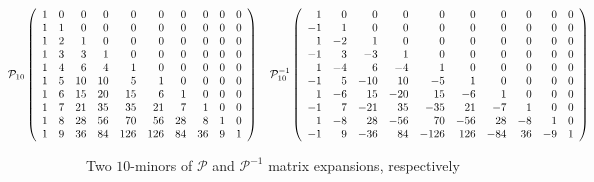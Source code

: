 

\begin{table}
    \begin{displaymath} 
        \hspace{-2.5cm}
        \mathcal{P}_{10}\left(\begin{array}{rrrrrrrrrr}
        1 & 0 & 0 & 0 & 0 & 0 & 0 & 0 & 0 & 0 \\
        1 & 1 & 0 & 0 & 0 & 0 & 0 & 0 & 0 & 0 \\
        1 & 2 & 1 & 0 & 0 & 0 & 0 & 0 & 0 & 0 \\
        1 & 3 & 3 & 1 & 0 & 0 & 0 & 0 & 0 & 0 \\
        1 & 4 & 6 & 4 & 1 & 0 & 0 & 0 & 0 & 0 \\
        1 & 5 & 10 & 10 & 5 & 1 & 0 & 0 & 0 & 0 \\
        1 & 6 & 15 & 20 & 15 & 6 & 1 & 0 & 0 & 0 \\
        1 & 7 & 21 & 35 & 35 & 21 & 7 & 1 & 0 & 0 \\
        1 & 8 & 28 & 56 & 70 & 56 & 28 & 8 & 1 & 0 \\
        1 & 9 & 36 & 84 & 126 & 126 & 84 & 36 & 9 & 1
        \end{array}\right) 
        \quad
        \mathcal{P}_{10}^{-1}\left(\begin{array}{rrrrrrrrrr}
        1 & 0 & 0 & 0 & 0 & 0 & 0 & 0 & 0 & 0 \\
        -1 & 1 & 0 & 0 & 0 & 0 & 0 & 0 & 0 & 0 \\
        1 & -2 & 1 & 0 & 0 & 0 & 0 & 0 & 0 & 0 \\
        -1 & 3 & -3 & 1 & 0 & 0 & 0 & 0 & 0 & 0 \\
        1 & -4 & 6 & -4 & 1 & 0 & 0 & 0 & 0 & 0 \\
        -1 & 5 & -10 & 10 & -5 & 1 & 0 & 0 & 0 & 0 \\
        1 & -6 & 15 & -20 & 15 & -6 & 1 & 0 & 0 & 0 \\
        -1 & 7 & -21 & 35 & -35 & 21 & -7 & 1 & 0 & 0 \\
        1 & -8 & 28 & -56 & 70 & -56 & 28 & -8 & 1 & 0 \\
        -1 & 9 & -36 & 84 & -126 & 126 & -84 & 36 & -9 & 1
        \end{array}\right) 
    \end{displaymath}

  \caption[$\mathcal{P}$ and $\mathcal{P}^{-1}$]{Two $10$-minors of
  $\mathcal{P}$ and $\mathcal{P}^{-1}$ matrix expansions, respectively}

  \label{tab:pascal:array} 
  
  \end{table}


